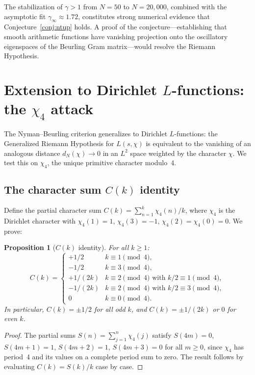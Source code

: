 \documentclass[11pt,a4paper]{article}
\newtheorem{proposition}{Proposition}
\begin{document}
The stabilization of $\gamma > 1$ from $N = 50$ to $N = 20{,}000$, combined with the asymptotic fit $\gamma_\infty \approx 1.72$, constitutes strong numerical evidence that Conjecture~\ref{conj:ntup} holds. A proof of the conjecture---establishing that smooth arithmetic functions have vanishing projection onto the oscillatory eigenspaces of the Beurling Gram matrix---would resolve the Riemann Hypothesis.

\section{Extension to Dirichlet $L$-functions: the $\chi_4$ attack}

The Nyman--Beurling criterion generalizes to Dirichlet $L$-functions: the Generalized Riemann Hypothesis for $L(s,\chi)$ is equivalent to the vanishing of an analogous distance $d_N(\chi) \to 0$ in an $L^2$ space weighted by the character $\chi$. We test this on $\chi_4$, the unique primitive character modulo~4.

\subsection{The character sum $C(k)$ identity}

Define the partial character sum $C(k) = \sum_{n=1}^{k} \chi_4(n) / k$, where $\chi_4$ is the Dirichlet character with $\chi_4(1) = 1$, $\chi_4(3) = -1$, $\chi_4(2) = \chi_4(0) = 0$. We prove:

\begin{proposition}[$C(k)$ identity]\label{prop:ck}
For all $k \geq 1$:
\[
C(k) = \begin{cases}
+1/2 & k \equiv 1 \pmod{4}, \\
-1/2 & k \equiv 3 \pmod{4}, \\
+1/(2k) & k \equiv 2 \pmod{4}\text{ with } k/2 \equiv 1 \pmod{4}, \\
-1/(2k) & k \equiv 2 \pmod{4}\text{ with } k/2 \equiv 3 \pmod{4}, \\
0 & k \equiv 0 \pmod{4}.
\end{cases}
\]
In particular, $C(k) = \pm 1/2$ for all odd $k$, and $C(k) = \pm 1/(2k)$ or $0$ for even $k$.
\end{proposition}

\begin{proof}
The partial sums $S(n) = \sum_{j=1}^{n} \chi_4(j)$ satisfy $S(4m) = 0$, $S(4m+1) = 1$, $S(4m+2) = 1$, $S(4m+3) = 0$ for all $m \geq 0$, since $\chi_4$ has period~4 and its values on a complete period sum to zero. The result follows by evaluating $C(k) = S(k)/k$ case by case.
\end{proof}
\end{document}
